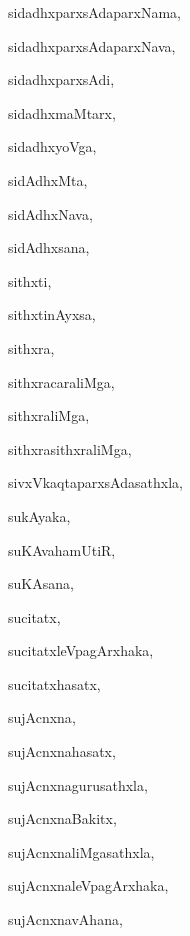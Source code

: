 \begin{multicols}{3}
{\noindent
{sidadhxparxsAdaparxNama}, \pageref{sidadhxparxsAdaparxNama}

\noindent
{sidadhxparxsAdaparxNava}, \pageref{sidadhxparxsAdaparxNava}

\noindent
{sidadhxparxsAdi}, \pageref{sidadhxparxsAdi}

\noindent
{sidadhxmaMtarx}, \pageref{sidadhxmaMtarx}

\noindent
{sidadhxyoVga}, \pageref{sidadhxyoVga}

\noindent
{sidAdhxMta}, \pageref{sidAdhxMta}

\noindent
{sidAdhxNava}, \pageref{sidAdhxNava}

\noindent
{sidAdhxsana}, \pageref{sidAdhxsana}

\noindent
{sithxti}, \pageref{sithxti}

\noindent
{sithxtinAyxsa}, \pageref{sithxtinAyxsa}

\noindent
{sithxra}, \pageref{sithxra}

\noindent
{sithxracaraliMga}, \pageref{sithxracaraliMga}

\noindent
{sithxraliMga}, \pageref{sithxraliMga}

\noindent
{sithxrasithxraliMga}, \pageref{sithxrasithxraliMga}

\noindent
{sivxVkaqtaparxsAdasathxla}, \pageref{sivxVkaqtaparxsAdasathxla}

\noindent
{sukAyaka}, \pageref{sukAyaka}

\noindent
{suKAvahamUtiR}, \pageref{suKAvahamUtiR}

\noindent
{suKAsana}, \pageref{suKAsana}

\noindent
{sucitatx}, \pageref{sucitatx}

\noindent
{sucitatxleVpagArxhaka}, \pageref{sucitatxleVpagArxhaka}

\noindent
{sucitatxhasatx}, \pageref{sucitatxhasatx}

\noindent
{sujAcnxna}, \pageref{sujAcnxna}

\noindent
{sujAcnxnahasatx}, \pageref{sujAcnxnahasatx}

\noindent
{sujAcnxnagurusathxla}, \pageref{sujAcnxnagurusathxla}

\noindent
{sujAcnxnaBakitx}, \pageref{sujAcnxnaBakitx}

\noindent
{sujAcnxnaliMgasathxla}, \pageref{sujAcnxnaliMgasathxla}

\noindent
{sujAcnxnaleVpagArxhaka}, \pageref{sujAcnxnaleVpagArxhaka}

\noindent
{sujAcnxnavAhana}, \pageref{sujAcnxnavAhana}

}
\end{multicols}
